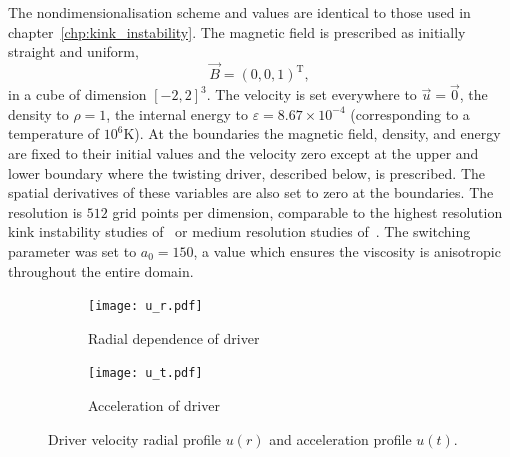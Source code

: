 The nondimensionalisation scheme and values are identical to those used in chapter~\ref{chp:kink_instability}. The magnetic field is prescribed as initially straight and uniform,
\begin{equation}
\vec{B} = (0, 0, 1)^{\text{T}},
\end{equation}
in a cube of dimension $[-2,2]^3$. The velocity is set everywhere to $\vec{u} = \vec{0}$, the density to $\rho = 1$, the internal energy to $\varepsilon = 8.67\times 10^{-4}$ (corresponding to a temperature of $10^6$K). At the boundaries the magnetic field, density, and energy are fixed to their initial values and the velocity zero except at the upper and lower boundary where the twisting driver, described below, is prescribed. The spatial derivatives of these variables are also set to zero at the boundaries. The resolution is $512$ grid points per dimension, comparable to the highest resolution kink instability studies of~\cite{hoodCoronalHeatingMagnetic2009} or medium resolution studies of~\cite{barefordShockHeatingNumerical2015}. The switching parameter was set to $a_0 = 150$, a value which ensures the viscosity is anisotropic throughout the entire domain. 

\begin{figure}[t]
  \centering
  \begin{subfigure}{.49\textwidth}
  \centering
  \texttt{[image: u\_r.pdf]}
  \caption{Radial dependence of driver}
  \label{fig:kink_radial_driver}
  \end{subfigure}
  \begin{subfigure}{.49\textwidth}
  \centering
  \texttt{[image: u\_t.pdf]}
  \caption{Acceleration of driver}
  \label{fig:kink_driver_accel}
  \end{subfigure}
  
  \caption{Driver velocity radial profile $u(r)$ and acceleration profile $u(t)$.}
  \label{fig:kink_driver}
\end{figure}


